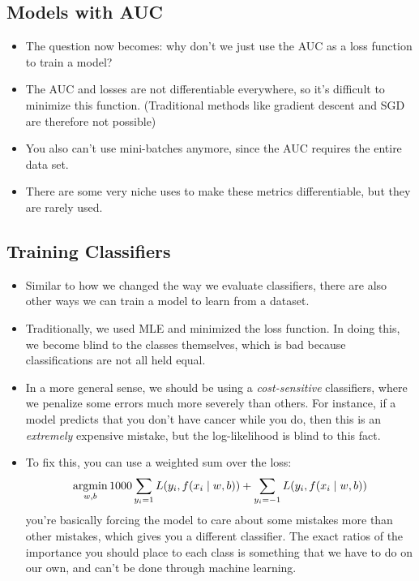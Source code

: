 \subsection{Models with AUC}
\begin{itemize}
	\item The question now becomes: why don't we just use the AUC as a loss function
		to train a model?
	\item The AUC and losses are not differentiable everywhere, so it's difficult to
		minimize this function. (Traditional methods like gradient descent and SGD are
		therefore not possible)
	\item You also can't use mini-batches anymore, since the AUC requires the entire
		data set. 
	\item There are some very niche uses to make these metrics differentiable, but
		they are rarely used.  
\end{itemize}

\subsection{Training Classifiers}
\begin{itemize}
	\item Similar to how we changed the way we evaluate classifiers, there are also
		other ways we can train a model to learn from a dataset. 
	\item Traditionally, we used MLE and minimized the loss function. In doing this,
		we become blind to the classes themselves, which is bad because
		classifications are not all held equal. 
	\item In a more general sense, we should be using a \textit{cost-sensitive}
		classifiers, where we penalize some errors much more severely than others.
		For instance, if a model predicts that you don't have cancer while you do,
		then this is an \textit{extremely} expensive mistake, but the log-likelihood
		is blind to this fact. 
	\item To fix this, you can use a weighted sum over the loss:
		\[
			\operatorname*{argmin}_{w, b} 1000 \sum_{y_i = 1}L(y_i, f(x_i \mid w, b)) + 
			\sum_{y_i = -1}L(y_i, f(x_i \mid w,b))
		\]
		you're basically forcing the model to care about some mistakes more than
		other mistakes, which gives you a different classifier. The exact ratios of
		the importance you should place to each class is something that we have to do
		on our own, and can't be done through machine learning. 
\end{itemize}
